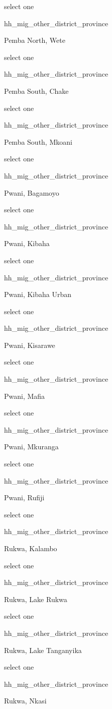 \documentclass[]{article}
\begin{document}
select one

hh\_mig\_other\_district\_province

Pemba North, Wete

select one

hh\_mig\_other\_district\_province

Pemba South, Chake

select one

hh\_mig\_other\_district\_province

Pemba South, Mkoani

select one

hh\_mig\_other\_district\_province

Pwani, Bagamoyo

select one

hh\_mig\_other\_district\_province

Pwani, Kibaha

select one

hh\_mig\_other\_district\_province

Pwani, Kibaha Urban

select one

hh\_mig\_other\_district\_province

Pwani, Kisarawe

select one

hh\_mig\_other\_district\_province

Pwani, Mafia

select one

hh\_mig\_other\_district\_province

Pwani, Mkuranga

select one

hh\_mig\_other\_district\_province

Pwani, Rufiji

select one

hh\_mig\_other\_district\_province

Rukwa, Kalambo

select one

hh\_mig\_other\_district\_province

Rukwa, Lake Rukwa

select one

hh\_mig\_other\_district\_province

Rukwa, Lake Tanganyika

select one

hh\_mig\_other\_district\_province

Rukwa, Nkasi
\end{document}
